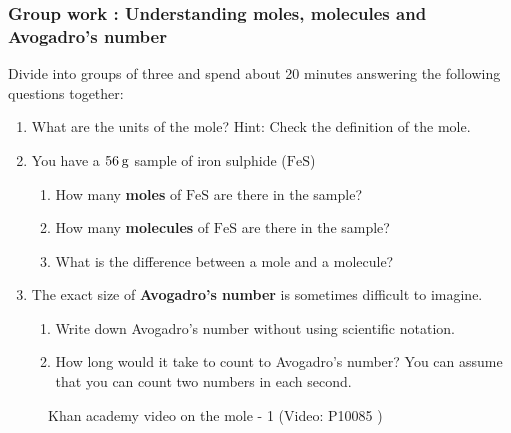             \subsubsection{  Group work : Understanding moles, molecules and Avogadro's number
      }
            \nopagebreak
      \label{m38717*id279596}Divide into groups of three and spend about 20 minutes answering the following questions together:\par 
      \label{m38717*id279603}\begin{enumerate}[noitemsep, label=\textbf{\arabic*}. ] 
            \label{m38717*uid39}\item What are the units of the mole? Hint: Check the definition of the mole.
\label{m38717*uid40}\item You have a $56\phantom{\rule{2pt}{0ex}}\mathrm{g}$ sample of iron sulphide ($\mathrm{FeS}$)
\label{m38717*id279631}\begin{enumerate}[noitemsep, label=\textbf{\alph*}. ] 
            \label{m38717*uid41}\item How many \textbf{moles} of $\mathrm{FeS}$ are there in the sample?
\label{m38717*uid42}\item How many \textbf{molecules} of $\mathrm{FeS}$ are there in the sample?
\label{m38717*uid43}\item What is the difference between a mole and a molecule?
\end{enumerate}
        \label{m38717*uid44}\item The exact size of \textbf{Avogadro's number} is sometimes difficult to imagine.
\label{m38717*id279703}\begin{enumerate}[noitemsep, label=\textbf{\alph*}. ] 
            \label{m38717*uid45}\item Write down Avogadro's number without using scientific notation.
\label{m38717*uid46}\item How long would it take to count to Avogadro's number? You can assume that you can count two numbers in each second.
\end{enumerate}
        \end{enumerate}
\label{m38717*eip-945}
    \setcounter{subfigure}{0}
	\begin{figure}[H] %
    \textnormal{Khan academy video on the mole - 1}\vspace{.1in} \nopagebreak
  \label{m38717*yt-media2}\label{m38717*yt-video2}
             { (Video:  P10085 )}
      \vspace{2pt}
    \vspace{.1in}
 \end{figure}       \par \label{m38717*secfhsst!!!underscore!!!id850}
